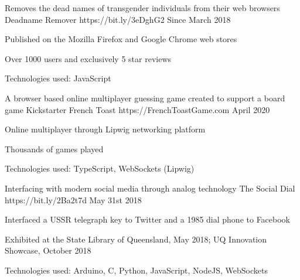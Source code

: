 


\begin{cventries}

\cventry
{Removes the dead names of transgender individuals from their web browsers} %
{Deadname Remover} %
{https://bit.ly/3eDghG2} %
{Since March 2018} %
{ %
\begin{cvitems}
\item Published on the Mozilla Firefox and Google Chrome web stores
\item Over 1000 users and exclusively 5 star reviews
\item Technologies used: JavaScript
\end{cvitems}
}

\cventry
{A browser based online multiplayer guessing game created to support a board game Kickstarter} %
{French Toast} %
{https://FrenchToastGame.com} %
{April 2020} %
{ %
\begin{cvitems}
\item Online multiplayer through Lipwig networking platform
\item Thousands of games played
\item Technologies used: TypeScript, WebSockets (Lipwig)
\end{cvitems}
}

\cventry
{Interfacing with modern social media through analog technology} %
{The Social Dial} %
{https://bit.ly/2Ba2t7d} %
{May 31st 2018} %
{ %
\begin{cvitems}
\item Interfaced a USSR telegraph key to Twitter and a 1985 dial phone to Facebook
\item Exhibited at the State Library of Queensland, May 2018; UQ Innovation Showcase, October 2018
\item Technologies used: Arduino, C, Python, JavaScript, NodeJS, WebSockets
\end{cvitems}
}


\end{cventries}
